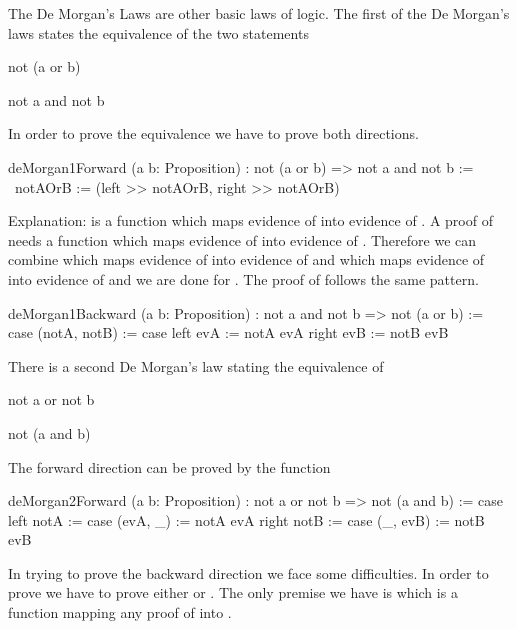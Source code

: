 The De Morgan's Laws are other basic laws of logic. The first of the De
Morgan's laws states the equivalence of the two statements
\begin{alba}
  not (a or b)

  not a and not b
\end{alba}
%
In order to prove the equivalence we have to prove both directions.
\begin{alba}
    deMorgan1Forward
        (a b: Proposition)
        : not (a or b) => not a and not b
    :=
        \ notAOrB :=
            (left >> notAOrB,  right >> notAOrB)
\end{alba}
%
Explanation:  is a function which maps evidence of 
into evidence of . A proof of  needs a function which
maps evidence of  into evidence of . Therefore we can
combine  which maps evidence of  into evidence of  and  which maps evidence of  into evidence of
 and we are done for . The proof of  follows
the same pattern.



\begin{alba}
    deMorgan1Backward
        (a b: Proposition)
        : not a and not b => not (a or b)
    :=
        case
            (notA, notB) :=
                case
                    left evA :=
                        notA evA
                    right evB :=
                        notB evB
\end{alba}


There is a second De Morgan's law stating the equivalence of
\begin{alba}
  not a or not b

  not (a and b)
\end{alba}

The forward direction can be proved by the function
\begin{alba}
    deMorgan2Forward
        (a b: Proposition)
        : not a or not b => not (a and b)
    :=
        case
            left notA :=
                case
                    (evA, _) :=
                        notA evA
            right notB :=
                case
                    (_, evB) :=
                        notB evB
\end{alba}


In trying to prove the backward direction we face some difficulties. In order
to prove  we have to prove either  or
. The only premise we have is  which is a
function mapping any proof of  into .

